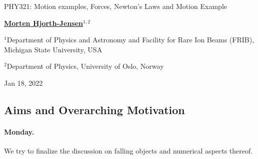 \documentclass[%
oneside,                 %
final,                   %
10pt]{article}
\begin{document}

\newcommand{\exercisesection}[1]{\subsection*{#1}}






\thispagestyle{empty}

\begin{center}
{\LARGE\bf
\begin{spacing}{1.25}
PHY321: Motion examples, Forces, Newton's Laws and Motion Example
\end{spacing}
}
\end{center}


\begin{center}
{\bf \href{{http://mhjgit.github.io/info/doc/web/}}{Morten Hjorth-Jensen}${}^{1, 2}$} \\ [0mm]
\end{center}

\begin{center}
\centerline{{\small ${}^1$Department of Physics and Astronomy and Facility for Rare Ion Beams (FRIB), Michigan State University, USA}}
\centerline{{\small ${}^2$Department of Physics, University of Oslo, Norway}}
\end{center}
    

\begin{center}
Jan 18, 2022
\end{center}

\vspace{1cm}


\subsection*{Aims and Overarching Motivation}

\paragraph{Monday.}
We try to finalize the discussion on falling objects and numerical aspects thereof.
\end{document}
